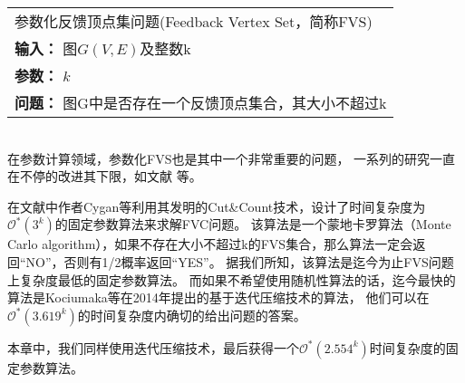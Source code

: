 \begin{tabular}{| p{0.9\headwidth} |}
  \hline
  参数化反馈顶点集问题(Feedback Vertex Set，简称FVS) \\
  \textbf{输入：} 图$G(V, E)$及整数k \\
  \textbf{参数：} $k$\\
  \textbf{问题：} 图G中是否存在一个反馈顶点集合，其大小不超过k\\
  \hline
\end{tabular} \vspace{0.5cm} \\

在参数计算领域，参数化FVS也是其中一个非常重要的问题，
一系列的研究一直在不停的改进其下限，如文献\cite{bodlaender1994disjoint,downey1992fixed,downey2012parameterized,raman2006faster,kanj2004parameterized,dehne20072o,guo2006compression,chen2008improved,cao2010feedback,cygan2011solving,kociumaka2014faster} 等。

在文献\cite{cygan2011solving}中作者Cygan等利用其发明的Cut\&Count技术，设计了时间复杂度为$\mathcal{O}^*(3^k)$的固定参数算法来求解FVC问题。
该算法是一个蒙地卡罗算法（Monte Carlo algorithm），如果不存在大小不超过k的FVS集合，那么算法一定会返回“NO”，否则有1/2概率返回“YES”。
据我们所知，该算法是迄今为止FVS问题上复杂度最低的固定参数算法。
而如果不希望使用随机性算法的话，迄今最快的算法是Kociumaka等在2014年提出的基于迭代压缩技术的算法，
他们可以在$\mathcal{O}^*(3.619^k)$的时间复杂度内确切的给出问题的答案。

本章中，我们同样使用迭代压缩技术，最后获得一个\textcolor[rgb]{1.00,0.00,0.00}{$\mathcal{O}^*(2.554^k)$}时间复杂度的固定参数算法。

